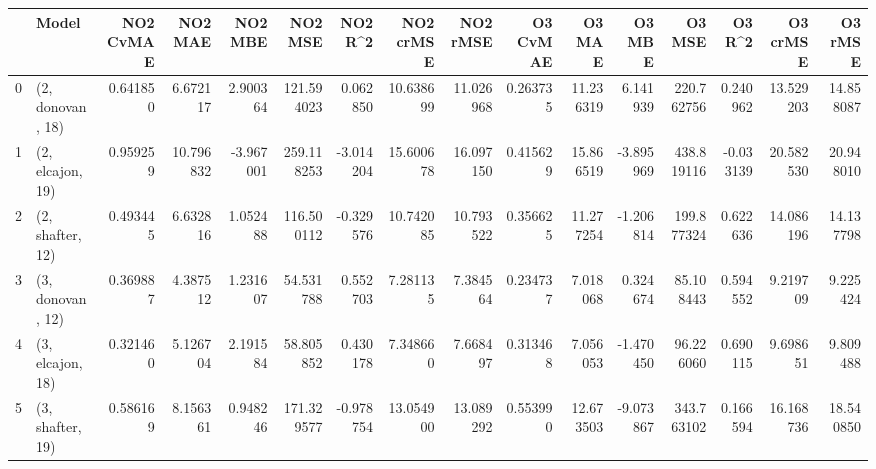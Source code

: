 \begin{tabular}{llrrrrrrrrrrrrrr}
\toprule
{} &             Model &  NO2 CvMAE &    NO2 MAE &   NO2 MBE &     NO2 MSE &   NO2 R\textasciicircum2 &  NO2 crMSE &   NO2 rMSE &  O3 CvMAE &     O3 MAE &    O3 MBE &      O3 MSE &    O3 R\textasciicircum2 &   O3 crMSE &    O3 rMSE \\
\midrule
0 &  (2, donovan, 18) &   0.641850 &   6.672117 &  2.900364 &  121.594023 &  0.062850 &  10.638699 &  11.026968 &  0.263735 &  11.236319 &  6.141939 &  220.762756 &  0.240962 &  13.529203 &  14.858087 \\
1 &  (2, elcajon, 19) &   0.959259 &  10.796832 & -3.967001 &  259.118253 & -3.014204 &  15.600678 &  16.097150 &  0.415629 &  15.866519 & -3.895969 &  438.819116 & -0.033139 &  20.582530 &  20.948010 \\
2 &  (2, shafter, 12) &   0.493445 &   6.632816 &  1.052488 &  116.500112 & -0.329576 &  10.742085 &  10.793522 &  0.356625 &  11.277254 & -1.206814 &  199.877324 &  0.622636 &  14.086196 &  14.137798 \\
3 &  (3, donovan, 12) &   0.369887 &   4.387512 &  1.231607 &   54.531788 &  0.552703 &   7.281135 &   7.384564 &  0.234737 &   7.018068 &  0.324674 &   85.108443 &  0.594552 &   9.219709 &   9.225424 \\
4 &  (3, elcajon, 18) &   0.321460 &   5.126704 &  2.191584 &   58.805852 &  0.430178 &   7.348660 &   7.668497 &  0.313468 &   7.056053 & -1.470450 &   96.226060 &  0.690115 &   9.698651 &   9.809488 \\
5 &  (3, shafter, 19) &   0.586169 &   8.156361 &  0.948246 &  171.329577 & -0.978754 &  13.054900 &  13.089292 &  0.553990 &  12.673503 & -9.073867 &  343.763102 &  0.166594 &  16.168736 &  18.540850 \\
\bottomrule
\end{tabular}
